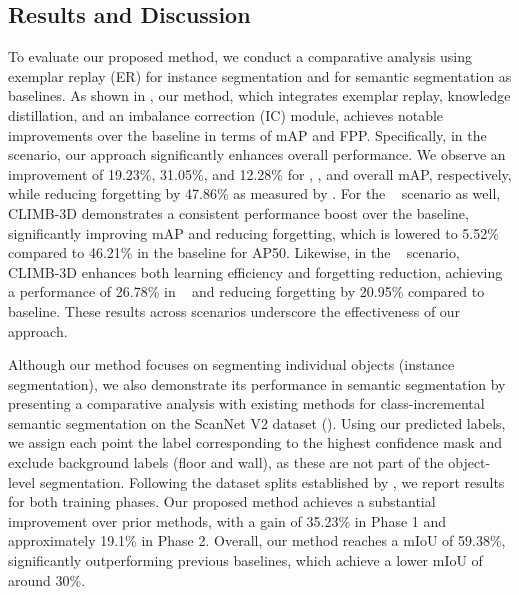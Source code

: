 \subsection{Results and Discussion}

To evaluate our proposed method, we conduct a comparative analysis using exemplar replay (ER) for instance segmentation and \cite{Yang_2023_CVPR} for semantic segmentation as baselines. As shown in , our method, which integrates exemplar replay, knowledge distillation, and an imbalance correction (IC) module, achieves notable improvements over the baseline in terms of mAP and FPP. Specifically, in the \fsplit~ scenario, our approach significantly enhances overall performance. We observe an improvement of 19.23\%, 31.05\%, and 12.28\% for \mapft, \maptf, and overall mAP, respectively, while reducing forgetting by 47.86\% as measured by \mapft.
% 
For the \ssplit~ scenario as well, CLIMB-3D demonstrates a consistent performance boost over the baseline, significantly improving mAP and reducing forgetting, which is lowered to 5.52\% compared to 46.21\% in the baseline for AP50.
% 
Likewise, in the \rsplit~ scenario, CLIMB-3D enhances both learning efficiency and forgetting reduction, achieving a performance of 26.78\% in \mapft~ and reducing forgetting by 20.95\% compared to baseline. These results across scenarios underscore the effectiveness of our approach.


Although our method focuses on segmenting individual objects (instance segmentation), we also demonstrate its performance in semantic segmentation by presenting a comparative analysis with existing methods for class-incremental semantic segmentation on the ScanNet V2 dataset (). Using our predicted labels, we assign each point the label corresponding to the highest confidence mask and exclude background labels (floor and wall), as these are not part of the object-level segmentation.
Following the dataset splits established by \cite{Yang_2023_CVPR}, we report results for both training phases. Our proposed method achieves a substantial improvement over prior methods, with a gain of 35.23\% in Phase 1 and approximately 19.1\% in Phase 2. Overall, our method reaches a mIoU of 59.38\%, significantly outperforming previous baselines, which achieve a lower mIoU of around 30\%.


